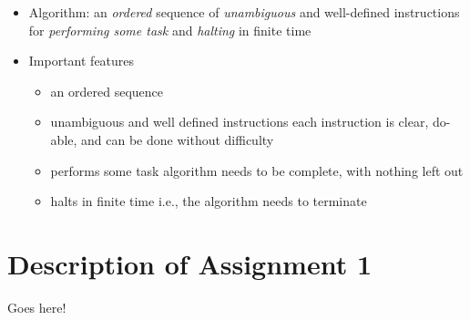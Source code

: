 \documentclass[ignorenonframetext,]{beamer}
\providecommand{\tightlist}{%
  \setlength{\itemsep}{0pt}\setlength{\parskip}{0pt}}
\begin{document}
\begin{itemize}[<+->]
\tightlist
\item
  Algorithm: an \emph{ordered} sequence of \emph{unambiguous} and
  well-defined instructions for \emph{performing some task} and
  \emph{halting} in finite time
\item
  Important features

  \begin{itemize}[<+->]
  \tightlist
  \item
    an ordered sequence
  \item
    unambiguous and well defined instructions each instruction is clear,
    do-able, and can be done without difficulty
  \item
    performs some task algorithm needs to be complete, with nothing left
    out
  \item
    halts in finite time i.e., the algorithm needs to terminate
  \end{itemize}
\end{itemize}

\section{Description of Assignment 1}\label{description-of-assignment-1}

Goes here!
\end{document}
